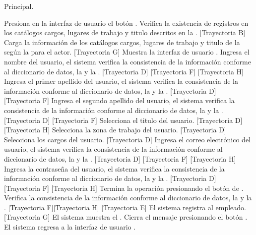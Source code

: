 \begin{UCtrayectoria}{Principal.}
	
	\UCpaso[\UCactor] Presiona en la interfaz de usuario  el botón \IUbutton{+}.
	\UCpaso  Verifica la existencia de registros en los catálogos cargos, lugares de trabajo y titulo descritos en la . [Trayectoria B] 
	\UCpaso Carga la información de los catálogos cargos, lugares de trabajo y titulo de la  según la  para el actor. [Trayectoria G]
	\UCpaso Muestra la interfaz de usuario  . 
	\UCpaso[\UCactor] Ingresa el nombre del usuario, el sistema verifica la consistencia de la información conforme al diccionario de datos, la   y la .  [Trayectoria D] [Trayectoria F]  [Trayectoria H] 
	\UCpaso[\UCactor] Ingresa el primer apellido del usuario, el sistema verifica la consistencia de la información conforme al diccionario de datos, la   y la .  [Trayectoria D] [Trayectoria F]  
	\UCpaso[\UCactor] Ingresa el segundo apellido del usuario, el sistema verifica la consistencia de la información conforme al diccionario de datos, la   y la .  [Trayectoria D] [Trayectoria F]  
	\UCpaso[\UCactor] Selecciona el titulo del usuario.  [Trayectoria D] [Trayectoria H]
	\UCpaso[\UCactor] Selecciona la zona de trabajo del usuario. [Trayectoria D]
	\UCpaso[\UCactor] Selecciona los cargos del usuario. [Trayectoria D]    
	\UCpaso[\UCactor] Ingresa el correo electrónico del usuario, el sistema verifica la consistencia de la información conforme al diccionario de datos, la   y la .  [Trayectoria D] [Trayectoria F]  [Trayectoria H] 
	\UCpaso[\UCactor] Ingresa la contraseña del usuario, el sistema verifica la consistencia de la información conforme al diccionario de datos, la   y la .  [Trayectoria D] [Trayectoria F]  [Trayectoria H] 
	\UCpaso[\UCactor]  Termina la operación presionando el botón de . 
	\UCpaso Verifica la consistencia de la información conforme al diccionario de datos, la  y la .  [Trayectoria F][Trayectoria H] [Trayectoria E]
	\UCpaso El sistema registra al empleado. [Trayectoria G]
	\UCpaso  El sistema muestra el .    
	\UCpaso[\UCactor] Cierra el mensaje presionando el botón .
	\UCpaso El sistema regresa a la interfaz de usuario .
\end{UCtrayectoria}


